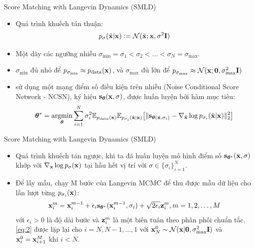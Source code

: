 \documentclass[10pt]{beamer}
\theoremstyle{remark}
\numberwithin{algocf}{section}
\numberwithin{equation}{section}
\numberwithin{dl}{section}
\numberwithin{figure}{section}
\begin{document}
\begin{frame}{Score Matching with Langevin Dynamics (SMLD)}
    \begin{itemize}
		\item Quá trình khuếch tán thuận:
		\begin{equation*}
			p_{\sigma}(\tilde{\bold{x}} \vert \bold{x}) \vcentcolon = \mathcal{N}(\tilde{\bold{x}};\bold{x}, \sigma^2 \bold{I})
		\end{equation*}
		\item Một dãy các ngưỡng nhiễu $\sigma_{\min} = \sigma_1 < \sigma_2 < \dots < \sigma_N = \sigma_{\max}$.
		\item $\sigma_{\min}$ đủ nhỏ để $p_{\sigma_{\min}} \approx p_{\mathrm{data}}(\bold{x})$, và $\sigma_{\max}$ đủ lớn để $p_{\sigma_{\max}}\approx \mathcal{N}(\bold{x}; \bold{0}, \sigma_{\max}^2 \bold{I})$
		\item \citep{song2019generative} sử dụng một mạng điểm số điều kiện trên nhiễu (Noise Conditional Score Network - NCSN), ký hiệu $\bold{s}_{\boldsymbol{\theta}}(\bold{x}, \sigma)$, được huấn luyện bởi hàm mục tiêu:
		\begin{equation} \label{eq:1}
			\boldsymbol{\theta}^{\ast} = \underset{\boldsymbol{\theta}}{\mathrm{argmin}} \sum_{i=1}^N \sigma_i^2 \mathbb{E}_{p_{\mathrm{data}}(\bold{x})} \mathbb{E}_{p_{\sigma_i}(\tilde{\bold{x}} \vert \bold{x})} \big\lbrack \lVert \bold{s}_{\boldsymbol{\theta} (\tilde{\bold{x}}, \sigma_i)} - \nabla_{\tilde{\bold{x}}} \log p_{\sigma_i} (\tilde{\bold{x}} \vert \bold{x})  \rVert_2^2 \big\rbrack
		\end{equation}
	\end{itemize}
\end{frame}

\begin{frame}{Score Matching with Langevin Dynamics (SMLD)}
	\begin{itemize}
		\item Quá trình khuếch tán ngược, khi ta đã huấn luyện mô hình điểm số $\bold{s}_{\boldsymbol{\theta}^{\ast}}(\bold{x}, \sigma)$ khớp với $\nabla_{\bold{x}} \log p_{\sigma}(\bold{x})$ tại hầu hết vị trí với $\sigma \in \lbrace \sigma_i \rbrace_{i=1}^N$.
		\item Để lấy mẫu, \citep{song2019generative} chạy M bước của Langevin MCMC để thu được mẫu dữ liệu cho lần lượt từng $p_{\sigma_i}(\bold{x})$:
		\begin{equation} \label{eq:2}
			\bold{x}_i^m = \bold{x}_i^{m-1} + \epsilon_i \bold{s}_{\boldsymbol{\theta}^{\ast}} (\bold{x}_i^{m-1}, \sigma_i) + \sqrt{2 \epsilon_i} \bold{z}_i^m, m = 1, 2, \dots, M
		\end{equation}
		với $\epsilon_i > 0$ là độ dài bước và $\bold{z}_i^m$ là một biến tuân theo phân phối chuẩn tắc.
		\ref{eq:2} được lặp lại cho $i=N, N-1, \dots, 1$ với $\bold{x}_N^0 \sim \mathcal{N}(\bold{x} \vert \bold{0}, \sigma_{\max}^2 \bold{I})$ và $\bold{x}_i^0 = \bold{x}_{i+1}^M$ khi $i < N$.
	\end{itemize}
\end{frame}
\end{document}

